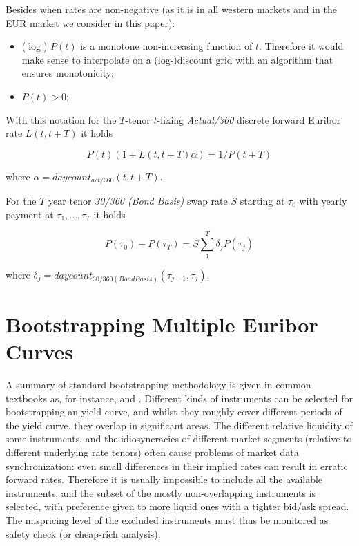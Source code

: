 \documentclass[11pt,reqno]{amsart}
\begin{document}
Besides when rates are non-negative (as it is in all western markets and in the EUR market we consider in this paper):
\begin{itemize}
\item ($\log $) $P(t) $ is a monotone non-increasing function of $t$. Therefore it would make sense to interpolate on a (log-)discount grid with an algorithm that ensures monotonicity;
\item $P\left( t\right) >0$;
\end{itemize}

With this notation for the $T$-tenor $t$-fixing {\it Actual/360} discrete forward Euribor rate $L(t, t+T)$ it holds

\begin{equation}
P(t) (1 + L(t, t+T) \alpha) = 1/P(t+T)
\label{eqn:Euriborrate}
\end{equation}

where $\alpha = daycount_{act/360}(t,t+T)$.

For the $T$ year tenor {\it 30/360 (Bond Basis)} swap rate $S$ starting at $\tau_0$ with yearly payment at $\tau_1, ..., \tau_T$ it holds

\begin{equation}
P(\tau_0)-P(\tau_T) = S \sum_1^T \delta_j P(\tau_j)
\label{eqn:swaprate}
\end{equation}

where $\delta_j = daycount_{30/360 (Bond Basis)}(\tau_{j-1}, \tau_j)$.

\section{\label{SecBootstrapping}Bootstrapping Multiple Euribor Curves}
A summary of standard bootstrapping methodology is given in common textbooks as, for instance, \cite{Hul08} and \cite{Reb1998}. Different kinds of instruments can be selected for bootstrapping an yield curve, and whilst they roughly cover different periods of the yield curve, they overlap in significant areas. The different relative liquidity of some instruments, and the idiosyncracies of different market segments (relative to different underlying rate tenors) often cause problems of market data synchronization: even small differences in their implied rates can result in erratic forward rates. Therefore it is usually impossible to include all the available instruments, and the subset of the mostly non-overlapping instruments is selected, with preference given to more liquid ones with a tighter bid/ask spread. The mispricing level of the excluded instruments must thus be monitored as safety check (or cheap-rich analysis).
\end{document}
